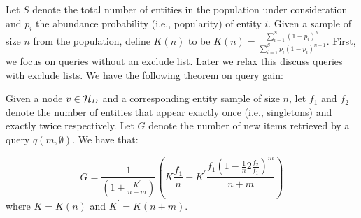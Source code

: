 Let $S$ denote the total number of entities in the population under consideration and $p_i$ the abundance probability (i.e., popularity) of entity $i$. Given a sample of size $n$ from the population, define $K(n)$ to be $K(n) = \frac{\sum_{i=1}^S (1-p_i)^n}{\sum_{i=1}^S p_i(1-p_i)^{n-1}}$. First, we focus on queries without an exclude list. Later we relax this discuss queries with exclude lists. We have the following theorem on query gain:

\vspace{-5pt}\begin{theorem}
\label{newgain}
Given a node $v \in \mathcal{H}_D$ and a corresponding entity sample of size $n$, let $f_1$ and $f_2$ denote the number of entities that appear exactly once (i.e., singletons) and exactly twice respectively. Let $G$ denote the number of new items retrieved by a query $q(m,\emptyset)$. We have that:

\vspace{-10pt}\begin{equation}
\label{eq:dirgain}
G = \frac{1}{(1 + \frac{K^{\prime}}{n+m})}(K\frac{f_1}{n} - K^{\prime}\frac{f_1(1-\frac{1}{n}2\frac{f_2}{f_1})^m}{n+m})
\end{equation}
where $K = K(n)$ and $K^{\prime} = K(n+m)$.
\end{theorem}
\iftr
